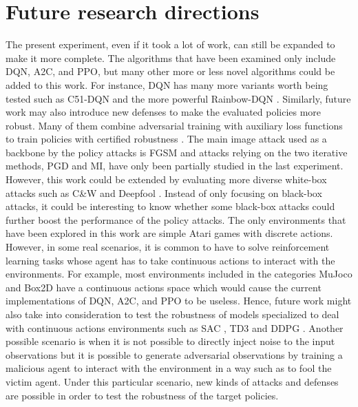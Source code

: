 \section{Future research directions}
The present experiment, even if it took a lot of work, can still be expanded to make it more complete. The algorithms that have been examined only include DQN, A2C, and PPO, but many other more or less novel algorithms could be added to this work. For instance, DQN has many more variants worth being tested such as C51-DQN \cite{bellemare2017distributional} and the more powerful Rainbow-DQN \cite{hessel2017rainbow}. Similarly, future work may also introduce new defenses to make the evaluated policies more robust. Many of them combine adversarial training with auxiliary loss functions to train policies with certified robustness \cite{wang2020adversarial} \cite{fischer2019online} \cite{zhang2020robust} \cite{oikarinen2020robust}. The main image attack used as a backbone by the policy attacks is FGSM and attacks relying on the two iterative methods, PGD and MI, have only been partially studied in the last experiment. However, this work could be extended by evaluating more diverse white-box attacks such as C\&W \cite{carlini2016evaluating} and Deepfool \cite{moosavidezfooli2016deepfool}. Instead of only focusing on black-box attacks, it could be interesting to know whether some black-box attacks could further boost the performance of the policy attacks. The only environments that have been explored in this work are simple Atari games with discrete actions. However, in some real scenarios, it is common to have to solve reinforcement learning tasks whose agent has to take continuous actions to interact with the environments. For example, most environments included in the categories MuJoco and Box2D have a continuous actions space which would cause the current implementations of DQN, A2C, and PPO to be useless. Hence, future work might also take into consideration to test the robustness of models specialized to deal with continuous actions environments such as SAC \cite{haarnoja2018soft}, TD3 \cite{fujimoto2018addressing} and DDPG \cite{lillicrap2019continuous}. Another possible scenario is when it is not possible to directly inject noise to the input observations but it is possible to generate adversarial observations by training a malicious agent to interact with the environment in a way such as to fool the victim agent. Under this particular scenario, new kinds of attacks and defenses are possible in order to test the robustness of the target policies.
